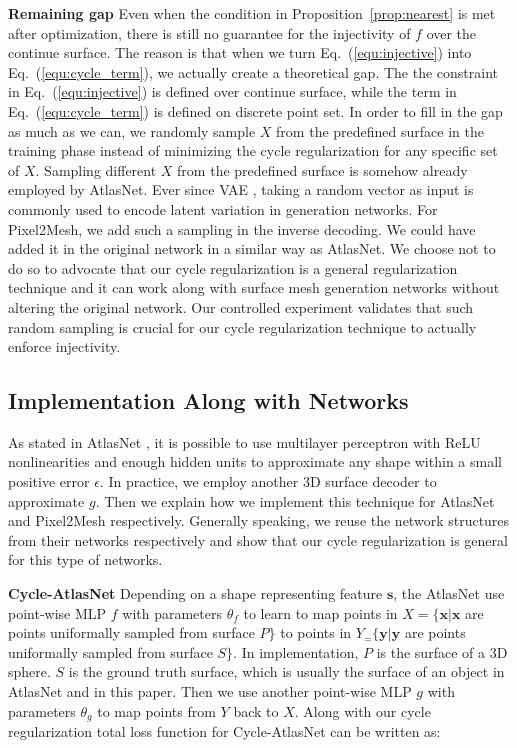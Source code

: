 \noindent\textbf{Remaining gap}
Even when the condition in Proposition~\ref{prop:nearest} is met after optimization, there is still no guarantee for the injectivity of $f$ over the continue surface. The reason is that when we turn Eq.~(\ref{equ:injective}) into Eq.~(\ref{equ:cycle_term}), we actually create a theoretical gap. 
The the constraint in Eq.~(\ref{equ:injective}) is defined over continue surface, while the term in  Eq.~(\ref{equ:cycle_term}) is defined on discrete point set. In order to fill in the gap as much as we can, we randomly sample $X$ from the predefined surface in the training phase instead of minimizing the cycle regularization for any specific set of $X$. Sampling different $X$ from the predefined surface is somehow already employed by AtlasNet. Ever since VAE \cite{VAE}, taking a random vector as input is commonly used to encode latent variation in generation networks. For Pixel2Mesh, we add such a sampling in the inverse decoding. We could have added it in the original network in a similar way as AtlasNet. We choose not to do so to advocate that our cycle regularization is a general regularization technique and it can work along with surface mesh generation networks without altering the original network. Our controlled experiment validates that such random sampling is crucial for our cycle regularization technique to actually enforce injectivity.

\subsection{Implementation Along with Networks}

As stated in AtlasNet \cite{atlasnet}, it is possible to use multilayer perceptron with ReLU nonlinearities and enough hidden units to approximate any shape within a small positive error $\epsilon$. In practice, we employ another 3D surface decoder to approximate $g$. Then we explain how we implement this technique for AtlasNet and Pixel2Mesh respectively. Generally speaking, we reuse the network structures from their networks respectively and show that our cycle regularization is general for this type of networks.

\noindent\textbf{Cycle-AtlasNet} Depending on a shape representing feature $\mathbf{s}$, the AtlasNet use point-wise MLP
$f$ with parameters $\theta_f$ to learn to map points in $X=\{\mathbf{x}| \mathbf{x}$ are points uniformally sampled from surface $P\}$ to points in $Y_=\{\mathbf{y}| \mathbf{y}$ are points uniformally sampled from surface $S\}$. In implementation, $P$ is the surface of a 3D sphere. $S$ is the ground truth surface, which is usually the surface of an object in AtlasNet \cite{atlasnet} and in this paper. Then we use another point-wise MLP $g$ with parameters $\theta_g$ to map points from $Y$ back to $X$. Along with our cycle regularization  total loss function for Cycle-AtlasNet can be written as:

